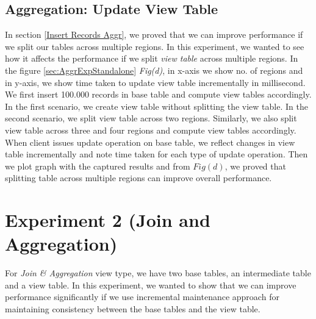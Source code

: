 \documentclass[11pt,a4paper,bibtotoc,idxtotoc,headsepline,footsepline,footexclude,BCOR12mm,DIV13]{scrbook}
\begin{document}

\subsection{Aggregation: Update View Table} 
\label{Update View Table Aggr}

In section \ref{Insert Records Aggr}, we proved that we can improve performance if we split our tables across multiple regions. In this experiment, we wanted to see how it affects the performance if we split \emph{view table} across multiple regions. In the figure \ref{sec:AggrExpStandalone} \emph{Fig(d)}, in x-axis we show no. of regions and in y-axis, we show time taken to update view table incrementally in millisecond. We first insert 100.000 records in base table and compute view tables accordingly. In the first scenario, we create view table without splitting the view table. In the second scenario, we split view table across two regions. Similarly, we also split view table across three and four regions and compute view tables accordingly. When client issues update operation on base table, we reflect changes in view table incrementally and note time taken for each type of update operation. Then we plot graph with the captured results and from $Fig(d)$, we proved that splitting table across multiple regions can improve overall performance. 

\section{Experiment 2 (Join and Aggregation)}
\label{sec:Join and Aggregation Exp} 

For \emph{Join \& Aggregation} view type, we have two base tables, an intermediate table and a view table. In this experiment, we wanted to show that we can improve performance significantly if we use incremental maintenance approach for maintaining consistency between the base tables and the view table. 
\end{document}

